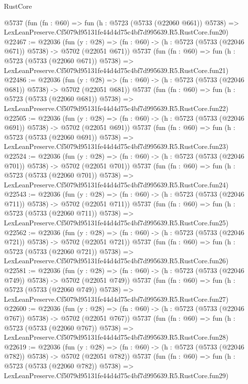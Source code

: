 \begin{lexlean}{RustCore}
\begin{coremodule}
    @5737
    (fun (fn : @60) =>
    fun (h : @5723 (@5733 (@22060 @661)) @5738) =>
    LexLeanPreserve.Cf5079d95131fe44d4d75c4bf7d995639.R5.RustCore.fun20)
@22467 := @22036
    (fun (y : @28) => (fn : @60) -> (h : @5723 (@5733 (@22046 @671)) @5738) -> @5702 (@22051 @671))
    @5737
    (fun (fn : @60) =>
    fun (h : @5723 (@5733 (@22060 @671)) @5738) =>
    LexLeanPreserve.Cf5079d95131fe44d4d75c4bf7d995639.R5.RustCore.fun21)
@22486 := @22036
    (fun (y : @28) => (fn : @60) -> (h : @5723 (@5733 (@22046 @681)) @5738) -> @5702 (@22051 @681))
    @5737
    (fun (fn : @60) =>
    fun (h : @5723 (@5733 (@22060 @681)) @5738) =>
    LexLeanPreserve.Cf5079d95131fe44d4d75c4bf7d995639.R5.RustCore.fun22)
@22505 := @22036
    (fun (y : @28) => (fn : @60) -> (h : @5723 (@5733 (@22046 @691)) @5738) -> @5702 (@22051 @691))
    @5737
    (fun (fn : @60) =>
    fun (h : @5723 (@5733 (@22060 @691)) @5738) =>
    LexLeanPreserve.Cf5079d95131fe44d4d75c4bf7d995639.R5.RustCore.fun23)
@22524 := @22036
    (fun (y : @28) => (fn : @60) -> (h : @5723 (@5733 (@22046 @701)) @5738) -> @5702 (@22051 @701))
    @5737
    (fun (fn : @60) =>
    fun (h : @5723 (@5733 (@22060 @701)) @5738) =>
    LexLeanPreserve.Cf5079d95131fe44d4d75c4bf7d995639.R5.RustCore.fun24)
@22543 := @22036
    (fun (y : @28) => (fn : @60) -> (h : @5723 (@5733 (@22046 @711)) @5738) -> @5702 (@22051 @711))
    @5737
    (fun (fn : @60) =>
    fun (h : @5723 (@5733 (@22060 @711)) @5738) =>
    LexLeanPreserve.Cf5079d95131fe44d4d75c4bf7d995639.R5.RustCore.fun25)
@22562 := @22036
    (fun (y : @28) => (fn : @60) -> (h : @5723 (@5733 (@22046 @721)) @5738) -> @5702 (@22051 @721))
    @5737
    (fun (fn : @60) =>
    fun (h : @5723 (@5733 (@22060 @721)) @5738) =>
    LexLeanPreserve.Cf5079d95131fe44d4d75c4bf7d995639.R5.RustCore.fun26)
@22581 := @22036
    (fun (y : @28) => (fn : @60) -> (h : @5723 (@5733 (@22046 @749)) @5738) -> @5702 (@22051 @749))
    @5737
    (fun (fn : @60) =>
    fun (h : @5723 (@5733 (@22060 @749)) @5738) =>
    LexLeanPreserve.Cf5079d95131fe44d4d75c4bf7d995639.R5.RustCore.fun27)
@22600 := @22036
    (fun (y : @28) => (fn : @60) -> (h : @5723 (@5733 (@22046 @767)) @5738) -> @5702 (@22051 @767))
    @5737
    (fun (fn : @60) =>
    fun (h : @5723 (@5733 (@22060 @767)) @5738) =>
    LexLeanPreserve.Cf5079d95131fe44d4d75c4bf7d995639.R5.RustCore.fun28)
@22619 := @22036
    (fun (y : @28) => (fn : @60) -> (h : @5723 (@5733 (@22046 @782)) @5738) -> @5702 (@22051 @782))
    @5737
    (fun (fn : @60) =>
    fun (h : @5723 (@5733 (@22060 @782)) @5738) =>
    LexLeanPreserve.Cf5079d95131fe44d4d75c4bf7d995639.R5.RustCore.fun29)

\end{coremodule}
\end{lexlean}
